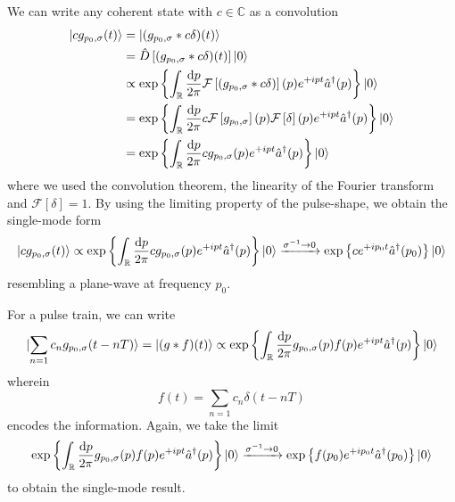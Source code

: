 We can write any coherent state with $c\in\mathbb{C}$ as a convolution
\begin{equation}
	\begin{split}
		\ket{cg_{p_0,\sigma}(t)}
		&=
		\ket{(g_{p_0,\sigma}*c\delta)(t)}
		\\
		&=
		\hat{D}\left[(g_{p_0,\sigma}*c\delta)(t)\right]
		\ket{0}
		\\
		&\propto
		\exp\left\{
			\int_{\mathbb{R}}
			\frac{\odif{p}}{2\pi}
			\mathcal{F}\left[(g_{p_0,\sigma}*c\delta)\right](p)
			e^{+ipt}
			\hat{a}^\dagger(p)
		\right\}
		\ket{0}
		\\
		&=
		\exp\left\{
			\int_{\mathbb{R}}
			\frac{\odif{p}}{2\pi}
			c
			\mathcal{F}\left[g_{p_0,\sigma}\right](p)
			\mathcal{F}\left[\delta\right](p)
			e^{+ipt}
			\hat{a}^\dagger(p)
		\right\}
		\ket{0}
		\\
		&=
		\exp\left\{
			\int_{\mathbb{R}}
			\frac{\odif{p}}{2\pi}
			cg_{p_0,\sigma}(p)
			e^{+ipt}
			\hat{a}^\dagger(p)
		\right\}
		\ket{0}
	\end{split}
\end{equation}
where we used the convolution theorem, the linearity of the Fourier transform and $\mathcal{F}[\delta]=1$.
By using the limiting property of the pulse-shape, we obtain the single-mode form
\begin{equation}
	\ket{cg_{p_0,\sigma}(t)}
	\propto
	\exp\left\{
		\int_{\mathbb{R}}
		\frac{\odif{p}}{2\pi}
		cg_{p_0,\sigma}(p)
		e^{+ipt}
		\hat{a}^\dagger(p)
	\right\}
	\ket{0}
	\xrightarrow{\sigma^{-1}\to0}
	\exp\left\{
		c
		e^{+ip_0t}
		\hat{a}^\dagger(p_0)
	\right\}
	\ket{0}
\end{equation}
resembling a plane-wave at frequency $p_0$.

For a pulse train, we can write
\begin{equation}
	\ket{\sum_{n=1}c_ng_{p_0,\sigma}(t-nT)}
	=
	\ket{(g*f)(t)}
	\propto
	\exp\left\{
		\int_{\mathbb{R}}
		\frac{\odif{p}}{2\pi}
		g_{p_0,\sigma}(p)
		f(p)e^{+ipt}
		\hat{a}^\dagger(p)
	\right\}
	\ket{0}
\end{equation}
wherein
\begin{equation}
	f(t)
	=
	\sum_{n=1}c_n\delta(t-nT)
\end{equation}
encodes the information.
Again, we take the limit
\begin{equation}
	\exp\left\{
		\int_{\mathbb{R}}
		\frac{\odif{p}}{2\pi}
		g_{p_0,\sigma}(p)
		f(p)e^{+ipt}
		\hat{a}^\dagger(p)
	\right\}
	\ket{0}
	\xrightarrow{\sigma^{-1}\to0}
	\exp\left\{
		f(p_0)
		e^{+ip_0t}
		\hat{a}^\dagger(p_0)
	\right\}
	\ket{0}	
\end{equation}
to obtain the single-mode result.

